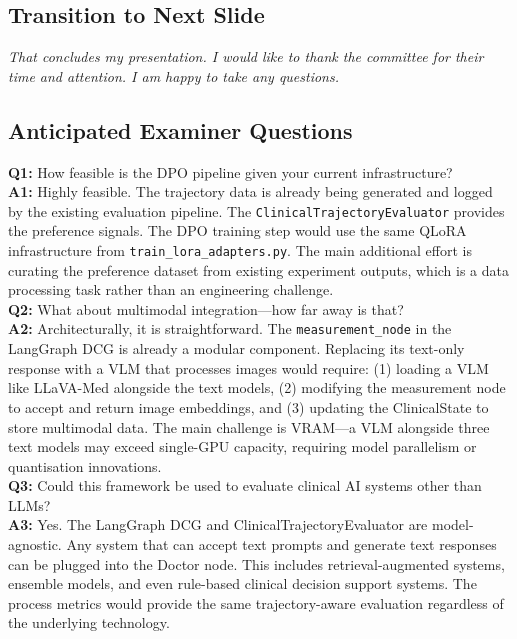 \subsection*{Transition to Next Slide}
{\color{transgreen}
\textit{That concludes my presentation. I would like to thank the committee for their time and attention. I am happy to take any questions.}
}

\subsection*{Anticipated Examiner Questions}
\begin{qabox}
\textbf{Q1:} How feasible is the DPO pipeline given your current infrastructure? \\
\textbf{A1:} Highly feasible. The trajectory data is already being generated and logged by the existing evaluation pipeline. The \texttt{ClinicalTrajectoryEvaluator} provides the preference signals. The DPO training step would use the same QLoRA infrastructure from \texttt{train\_lora\_adapters.py}. The main additional effort is curating the preference dataset from existing experiment outputs, which is a data processing task rather than an engineering challenge. \\[6pt]
\textbf{Q2:} What about multimodal integration---how far away is that? \\
\textbf{A2:} Architecturally, it is straightforward. The \texttt{measurement\_node} in the LangGraph DCG is already a modular component. Replacing its text-only response with a VLM that processes images would require: (1) loading a VLM like LLaVA-Med alongside the text models, (2) modifying the measurement node to accept and return image embeddings, and (3) updating the ClinicalState to store multimodal data. The main challenge is VRAM---a VLM alongside three text models may exceed single-GPU capacity, requiring model parallelism or quantisation innovations. \\[6pt]
\textbf{Q3:} Could this framework be used to evaluate clinical AI systems other than LLMs? \\
\textbf{A3:} Yes. The LangGraph DCG and ClinicalTrajectoryEvaluator are model-agnostic. Any system that can accept text prompts and generate text responses can be plugged into the Doctor node. This includes retrieval-augmented systems, ensemble models, and even rule-based clinical decision support systems. The process metrics would provide the same trajectory-aware evaluation regardless of the underlying technology.
\end{qabox}



